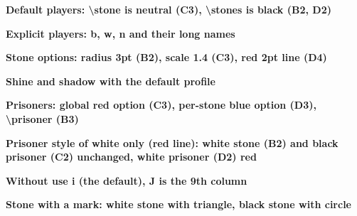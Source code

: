 \documentclass{article}
\newcommand\case[1]{\par\medskip\noindent\textbf{#1}\par\nopagebreak}
\begin{document}
\case{Default players: \textbackslash stone is neutral (C3), \textbackslash stones is black (B2, D2)}
\begin{goban}[5]\end{goban}

\case{Explicit players: b, w, n and their long names}
\begin{goban}[5]
\end{goban}

\case{Stone options: radius 3pt (B2), scale 1.4 (C3), red 2pt line (D4)}
\begin{goban}[5]
\end{goban}

\case{Shine and shadow with the default profile}
\begin{goban}[5]
\end{goban}

\case{Prisoners: global red option (C3), per-stone blue option (D3), \textbackslash prisoner (B3)}
\begin{goban}[5]
\end{goban}

\case{Prisoner style of white only (red line): white stone (B2) and black prisoner (C2) unchanged, white prisoner (D2) red}
\begin{goban}[5]
\end{goban}

\case{Without use i (the default), J is the 9th column}
\begin{goban}[9, label = {at = south}]\end{goban}

\case{Stone with a mark: white stone with triangle, black stone with circle}
\begin{goban}[5]\end{goban}
\end{document}
